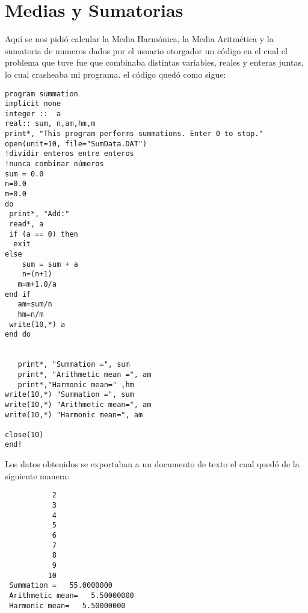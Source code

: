 \documentclass{article}
\begin{document}
\section{Medias y Sumatorias}
Aquí se nos pidió calcular la Media Harmónica, la Media Aritmética y la sumatoria de numeros dados por el usuario otorgador un código en el cual el problema que tuve fue que combinaba distintas variables, reales y enteras juntas, lo cual crasheaba mi programa.
el código quedó como sigue:
\begin{verbatim}
program summation
implicit none
integer ::  a
real:: sum, n,am,hm,m
print*, "This program performs summations. Enter 0 to stop."
open(unit=10, file="SumData.DAT")
!dividir enteros entre enteros
!nunca combinar números
sum = 0.0
n=0.0
m=0.0
do 
 print*, "Add:"
 read*, a
 if (a == 0) then
  exit
else
    sum = sum + a
    n=(n+1)
   m=m+1.0/a
end if
   am=sum/n
   hm=n/m
 write(10,*) a
end do
   

   print*, "Summation =", sum
   print*, "Arithmetic mean =", am
   print*,"Harmonic mean=" ,hm
write(10,*) "Summation =", sum
write(10,*) "Arithmetic mean=", am
write(10,*) "Harmonic mean=", am
   
close(10)
end!
\end{verbatim}
Los datos obtenidos se exportaban a un documento de texto el cual quedó de la siguiente manera:
\begin{verbatim}
           2
           3
           4
           5
           6
           7
           8
           9
          10
 Summation =   55.0000000    
 Arithmetic mean=   5.50000000    
 Harmonic mean=   5.50000000    
\end{verbatim}
\end{document}
